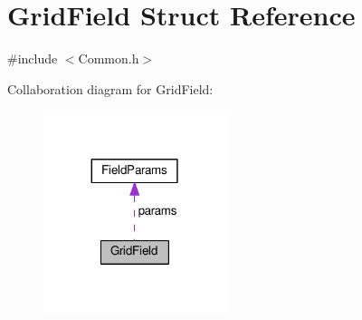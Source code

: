 \hypertarget{struct_grid_field}{}\section{Grid\+Field Struct Reference}
\label{struct_grid_field}


{\ttfamily \#include $<$Common.\+h$>$}



Collaboration diagram for Grid\+Field\+:\nopagebreak
\begin{figure}[H]
\begin{center}
\leavevmode
\includegraphics[width=152pt]{struct_grid_field__coll__graph}
\end{center}
\end{figure}
